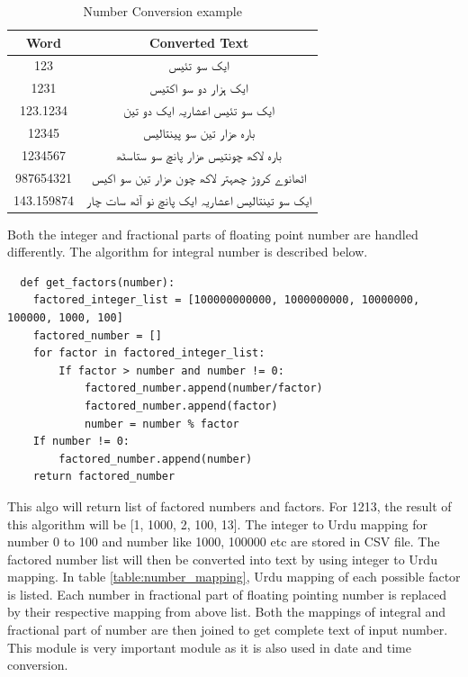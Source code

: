 \begin{table}[]
\centering
\begin{tabular}{|c|c|}
\hline
\textbf{Word} & \textbf{Converted Text}                          \\ \hline
123           & \texturdu{ایک سو تئیس}                                     \\ \hline
1231          & \texturdu{ایک ہزار دو سو اکتیس}                            \\ \hline
123.1234      & \texturdu{ایک سو تئیس اعشاریہ ایک دو تین}                   \\ \hline
12345         & \texturdu{بارہ ھزار تین سو پینتالیس}                        \\ \hline
1234567       & \texturdu{بارہ لاکھ چونتیس ھزار پانچ سو ستاسٹھ}             \\ \hline
987654321     & \texturdu{اٹھانوے کروڑ  چھہتر لاکھ   چون ھزار تین سو اکیس}  \\ \hline
143.159874    & \texturdu{ایک سو تینتالیس  اعشاریہ ایک پانچ نو آٹھ سات چار} \\ \hline
\end{tabular}
\caption{Number Conversion example}
\label{table:no_conversion_example}
\end{table}

Both the integer and fractional parts of floating point number are handled differently. The algorithm for integral number is described below.

\begin{verbatim}
  def get_factors(number):
    factored_integer_list = [100000000000, 1000000000, 10000000, 100000, 1000, 100]
    factored_number = []
    for factor in factored_integer_list:
        If factor > number and number != 0:
            factored_number.append(number/factor)
            factored_number.append(factor)
            number = number % factor  
    If number != 0:
        factored_number.append(number)
    return factored_number

\end{verbatim}

This algo will return list of factored numbers and factors. For 1213, the result of this algorithm will be 
[1, 1000, 2, 100, 13]. The integer to Urdu mapping for number 0 to 100 and number like 1000, 100000 etc are 
stored in CSV file. The factored number list will then be converted into text by using integer to Urdu mapping. 
In table \ref{table:number_mapping}, Urdu mapping of each possible factor is listed. Each number in fractional 
part of floating pointing number is replaced by their respective mapping from above list. 
Both the mappings of integral and fractional part of number are then joined to get
complete text of input number. This module is very important module as it is also used in date and time conversion.  

